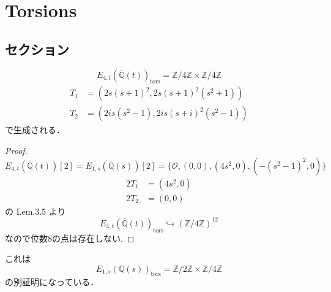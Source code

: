 \documentclass[main]{subfiles}
\begin{document}
\chapter{Torsions}

\section{セクション}

\begin{thm}
    \begin{equation}
        E_{4,t}(\overline{\mathbb{Q}}(t))_ \text{tors} = \mathbb{Z} / 4 \mathbb{Z} \times \mathbb{Z} / 4 \mathbb{Z}
    \end{equation}
    \begin{align}
        T_1 & = (2s(s+1)^2,2s(s+1)^2(s^2+1))    \\
        T_2 & = (2is(s^2-1),2is(s+i)^2(s^2-1))
    \end{align}
    で生成される．
\end{thm}
\begin{proof}
    \begin{equation}
        E_{4,t}(\overline{\mathbb{Q}}(t))[2] = E_{1,s}(\overline{\mathbb{Q}}(s))[2] = \{\mathcal{O}, (0,0), (4s^{2},0),( - (s^{2} - 1)^{2},0)\}
    \end{equation}
    \begin{align}
        2T_1 & = (4s^2,0) \\
        2T_2 & = (0,0)
    \end{align}
    \cite{ref:naskrecki2013} の Lem.3.5 より
    \begin{equation}
        E_{4,t}(\overline{\mathbb{Q}}(t))_ \text{tors} \hookrightarrow (\mathbb{Z} / 4 \mathbb{Z})^{12}
    \end{equation}
    なので位数8の点は存在しない.
\end{proof}

\begin{rem}
    これは
    \begin{equation}
        E_{1,s}(\mathbb{Q}(s))_ \text{tors} = \mathbb{Z} / 2 \mathbb{Z} \times \mathbb{Z} / 4 \mathbb{Z}
    \end{equation}
    の別証明になっている．
\end{rem}
\end{document}
